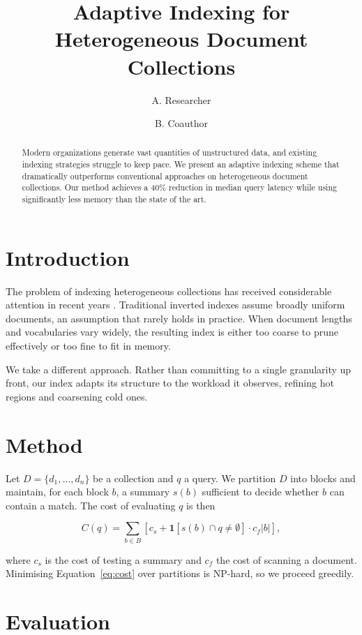 \documentclass[11pt]{article}
\title{Adaptive Indexing for Heterogeneous Document Collections}
\author{A. Researcher \and B. Coauthor}
\date{}
\begin{document}
\maketitle

\begin{abstract}
Modern organizations generate vast quantities of unstructured data, and existing
indexing strategies struggle to keep pace. We present an adaptive indexing scheme
that dramatically outperforms conventional approaches on heterogeneous document
collections. Our method achieves a 40\% reduction in median query latency while
using significantly less memory than the state of the art.
\end{abstract}

\section{Introduction}

The problem of indexing heterogeneous collections has received considerable
attention in recent years \citep{meridian2024}. Traditional inverted indexes
assume broadly uniform documents, an assumption that rarely holds in practice.
When document lengths and vocabularies vary widely, the resulting index is
either too coarse to prune effectively or too fine to fit in memory.

We take a different approach. Rather than committing to a single granularity up
front, our index adapts its structure to the workload it observes, refining hot
regions and coarsening cold ones.

\section{Method}

Let $D = \{d_1, \dots, d_n\}$ be a collection and $q$ a query. We partition $D$
into blocks and maintain, for each block $b$, a summary $s(b)$ sufficient to
decide whether $b$ can contain a match. The cost of evaluating $q$ is then

\begin{equation}
  C(q) = \sum_{b \in B} \left[ c_s + \mathbf{1}[s(b) \cap q \neq \emptyset] \cdot c_f |b| \right],
  \label{eq:cost}
\end{equation}

where $c_s$ is the cost of testing a summary and $c_f$ the cost of scanning a
document. Minimising Equation~\ref{eq:cost} over partitions is NP-hard, so we
proceed greedily.

\section{Evaluation}
\end{document}
